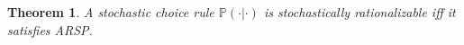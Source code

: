 \documentclass[11pt]{article}
\newtheorem{theorem}{Theorem}
\begin{document}



\begin{theorem}
A stochastic choice rule $\mathbb{P}(\cdot | \cdot)$ is stochastically rationalizable iff it satisfies ARSP.
\end{theorem}
\end{document}
